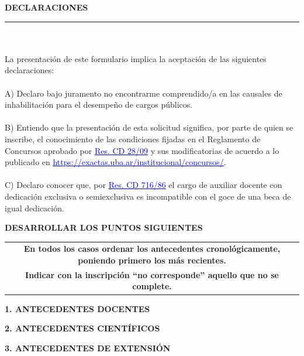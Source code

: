 \documentclass{article}
\newcommand{\titulosec}[1]{\textbf{\textsf{\MakeUppercase{#1}}}}
\newcommand{\seccion}[1]{
  \bigskip
  \noindent \titulosec{#1} \\
  \noindent\rule{\textwidth}{1pt}
}
\newcommand{\enlace}[2]{\href{#1}{\textcolor{blue}{\underline{#2}}}}
\begin{document}
\seccion{Declaraciones}

\newpage

\noindent \hrulefill
\\\\
\noindent La presentación de este formulario implica la aceptación de las siguientes declaraciones:
\\\\
\noindent A) Declaro bajo juramento no encontrarme comprendido/a en las causales de inhabilitación para el desempeño de cargos públicos.
\\\\
\noindent B) Entiendo que la presentación de esta solicitud significa, por parte de quien se inscribe, el conocimiento de las condiciones fijadas en el Reglamento de Concursos aprobado por \enlace{https://exactas.uba.ar/wp-content/uploads/2022/12/Res.CD-28-09-Reglamento-Concursos-Docentes-Auxiliares.pdf}{Res. CD 28/09} y sus modificatorias de acuerdo a lo publicado en \enlace{https://exactas.uba.ar/institucional/concursos/}{https://exactas.uba.ar/institucional/concursos/}.
\\\\
\noindent C) Declaro conocer que, por \enlace{http://exactas.uba.ar/wp-content/uploads/2017/06/res.cd_716-86_incompatibilidad_de_cargo_con_beca.pdf}{Res. CD 716/86} el cargo de auxiliar docente con dedicación exclusiva o semiexclusiva es incompatible con el goce de una beca de igual dedicación.

\newpage

\noindent \titulosec{Desarrollar los Puntos Siguientes}

\begin{center}
\setlength\tabcolsep{3pt}
\begin{tabular}{|c|}
    \hline
    \textbf{En todos los casos ordenar los antecedentes cronológicamente, poniendo primero los más recientes.} \\
    \textbf{Indicar con la inscripción “no corresponde” aquello que no se complete.} \\
    \hline
\end{tabular}
\end{center}

\noindent \titulosec{1. Antecedentes docentes}



\noindent \titulosec{2. Antecedentes científicos}



\noindent \titulosec{3. Antecedentes de extensión}
\end{document}
